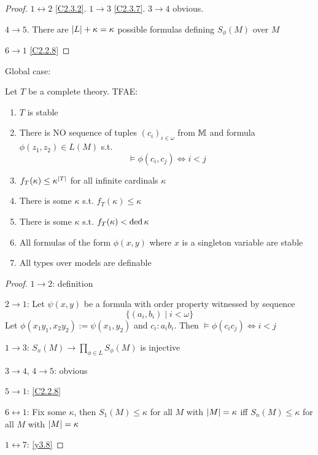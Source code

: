 \documentclass[11pt]{article}
\begin{document}
\begin{proof}
\(1\leftrightarrow 2\) \ref{C2.3.2}. \(1\to 3\) \ref{C2.3.7}. \(3\to 4\) obvious.

\(4\to 5\). There are \(\abs{L}+\kappa=\kappa\) possible formulas defining \(S_\phi(M)\) over \(M\)

\(6\to 1\) \ref{C2.2.8}
\end{proof}

Global case:
\begin{theorem}[]
\label{y3.9}
Let \(T\) be a complete theory. TFAE:
\begin{enumerate}
\item \(T\) is stable
\item There is NO sequence of tuples \((c_i)_{i\in\omega}\) from \(\mathbb{M}\) and formula \(\phi(z_1,z_2)\in L(M)\) s.t.
\begin{equation*}
\vDash\phi(c_i,c_j)\Leftrightarrow i<j
\end{equation*}
\item \(f_T(\kappa)\le\kappa^{\abs{T}}\) for all infinite cardinals \(\kappa\)
\item There is some \(\kappa\) s.t. \(f_T(\kappa)\le\kappa\)
\item There is some \(\kappa\) s.t. \(f_T(\kappa)<\operatorname{ded}\kappa\)
\item All formulas of the form \(\phi(x,y)\) where \(x\) is a singleton variable are stable
\item All types over models are definable
\end{enumerate}
\end{theorem}

\begin{proof}
\(1\to 2\): definition

\(2\to 1\): Let \(\psi(x,y)\) be a formula with order property witnessed by sequence
\begin{equation*}
\{(a_i,b_i)\mid i<\omega\}
\end{equation*}
Let \(\phi(x_1y_1,x_2y_2):=\psi(x_1,y_2)\) and \(c_i:a_ib_i\). Then \(\vDash\phi(c_ic_j)\Leftrightarrow i<j\)

\(1\to 3\): \(S_x(M)\to\prod_{\phi\in L}S_\phi(M)\) is injective

\(3\to 4\), \(4\to 5\): obvious

\(5\to 1\): \ref{C2.2.8}

\(6\leftrightarrow 1\): Fix some \(\kappa\), then \(S_1(M)\le\kappa\) for all \(M\) with \(\abs{M}=\kappa\) iff \(S_n(M)\le\kappa\) for all \(M\)
with \(\abs{M}=\kappa\)

\(1\leftrightarrow 7\): \ref{y3.8}
\end{proof}
\end{document}
